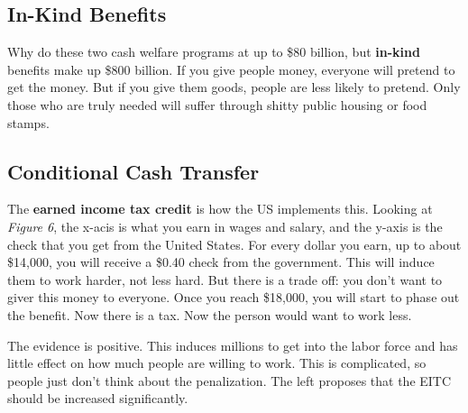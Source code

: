 \documentclass{article}
\begin{document}
\subsection{ In-Kind Benefits }

Why do these two cash welfare programs at up to \$80 billion, but
\textbf{in-kind} benefits make up \$800 billion. If you give people money,
everyone will pretend to get the money. But if you give them goods, people are
less likely to pretend. Only those who are truly needed will suffer through
shitty public housing or food stamps. 

\subsection{ Conditional Cash Transfer }

The \textbf{earned income tax credit} is how the US implements this. Looking at
\textit{Figure 6}, the x-acis is what you earn in wages and salary, and the
y-axis is the check that you get from the United States. For every dollar you
earn, up to about \$14,000, you will receive a \$0.40 check from the government.
This will induce them to work harder, not less hard. But there is a trade off:
you don't want to giver this money to everyone. Once you reach \$18,000, you
will start to phase out the benefit. Now there is a tax. Now the person would
want to work less. 

The evidence is positive. This induces millions to get into the labor force and
has little effect on how much people are willing to work. This is complicated,
so people just don't think about the penalization. The left proposes that the
EITC should be increased significantly.
\end{document}
